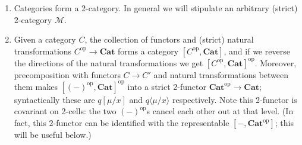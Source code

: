 \documentclass[10pt]{article}
\theoremstyle{definition}
\newcommand\ap[2]{\ensuremath{#1 \langle #2 \rangle }}
\newcommand\op{^{\mathrm{op}}}
\newcommand\Cat{\mathbf{Cat}}
\newcommand\M{\mathcal{M}}
\begin{document}
\begin{enumerate}
\item Categories form a 2-category.
  In general we will stipulate an arbitrary (strict) 2-category $\M$.
\item Given a category $C$, the collection of functors and (strict) natural transformations $C\op \to \Cat$ forms a category $[C\op, \Cat]$, and if we reverse the directions of the natural transformations we get $[C\op, \Cat]\op$.
  Moreover, precomposition with functors $C\to C'$ and natural transformations between them makes $[(-)\op, \Cat]\op$ into a strict 2-functor $\Cat\op \to \Cat$; syntactically these are $q[\mu/x]$ and $\ap{q}{\mu/x}$ respectively.
  Note this 2-functor is covariant on 2-cells: the two $(-)\op$s cancel each other out at that level.
  (In fact, this 2-functor can be identified with the representable $[-,\Cat\op]$; this will be useful below.)


\end{enumerate}
\end{document}
